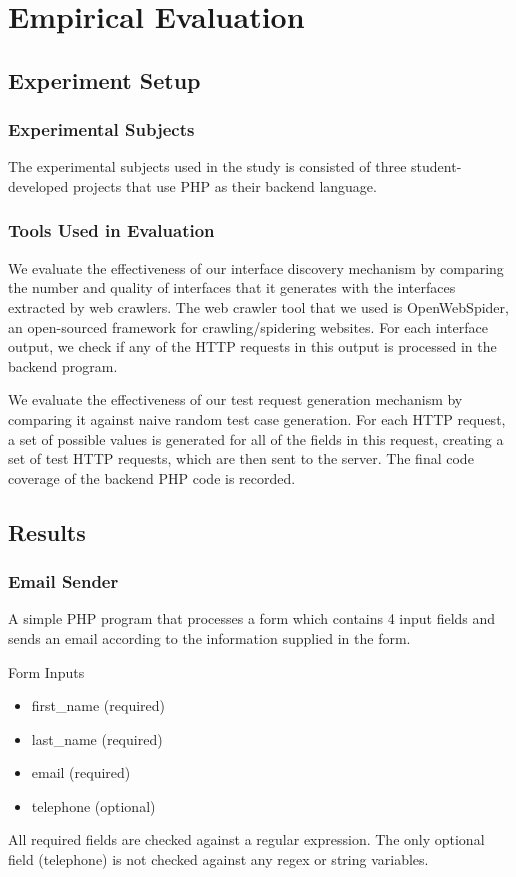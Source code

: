 \chapter{Empirical Evaluation}

\section{Experiment Setup}
\subsection{Experimental Subjects}
The experimental subjects used in the study is consisted of three student-developed projects that use PHP as their backend language.

\subsection{Tools Used in Evaluation}
We evaluate the effectiveness of our interface discovery mechanism by comparing the number and quality of interfaces that it generates with the interfaces extracted by web crawlers. The web crawler tool that we used is OpenWebSpider, an open-sourced framework for crawling/spidering websites. For each interface output, we check if any of the HTTP requests in this output is processed in the backend program.

We evaluate the effectiveness of our test request generation mechanism by comparing it against naive random test case generation. For each HTTP request, a set of possible values is generated for all of the fields in this request, creating a set of test HTTP requests, which are then sent to the server. The final code coverage of the backend PHP code is recorded.

\section{Results}

\subsection{Email Sender}
A simple PHP program that processes a form which contains 4 input fields and sends an email according to the information supplied in the form. 

Form Inputs
\begin{itemize}
\item first\_name (required)
\item last\_name (required)
\item email (required)
\item telephone (optional)
\end{itemize}
All required fields are checked against a regular expression. The only optional field (telephone) is not checked against any regex or string variables.

